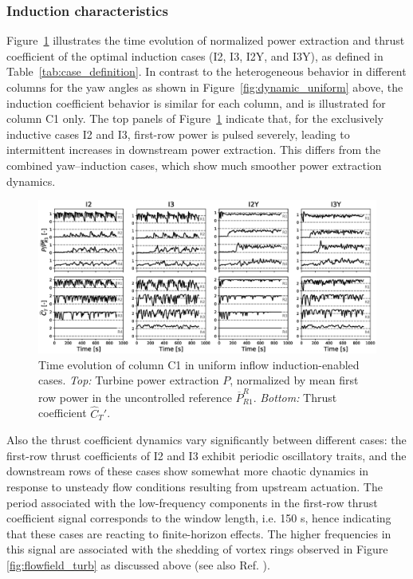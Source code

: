 \documentclass[energies,article,submit,moreauthors,latex,10pt,a4paper]{mdpi}
\begin{document}
\subsubsection{Induction characteristics}\label{subsec:uni_induction}
\noindent Figure~\ref{fig:dynamic_ctfilt} illustrates the time evolution of normalized power extraction and thrust coefficient of the optimal induction cases (I2, I3, I2Y, and I3Y), as defined in Table~\ref{tab:case_definition}. In contrast to the heterogeneous behavior in different columns for the yaw angles as shown in Figure~\ref{fig:dynamic_uniform} above, the induction coefficient behavior is similar for each column, and is illustrated for column C1 only. The top panels of Figure~\ref{fig:dynamic_ctfilt} indicate that, for the exclusively inductive cases I2 and I3, first-row power is pulsed severely, leading to intermittent increases in downstream power extraction. This differs from the combined yaw--induction cases, which show much smoother power extraction dynamics. 
\begin{figure}
	\includegraphics[width=\textwidth]{figure10}	
	\caption{Time evolution of column C1 in uniform inflow induction-enabled cases. \emph{Top: } Turbine power extraction $P$, normalized by mean first row power in the uncontrolled reference $\overline{P}_{R1}^R$. \emph{Bottom: } Thrust coefficient $\widehat{C}_T'$. \label{fig:dynamic_ctfilt}}
\end{figure}

Also the thrust coefficient dynamics vary significantly between different cases: the first-row thrust coefficients of I2 and I3 exhibit periodic oscillatory traits, and the downstream rows of these cases show somewhat more chaotic dynamics in response to unsteady flow conditions resulting from upstream actuation. The period associated with the low-frequency components in the first-row thrust coefficient signal corresponds to the window length, i.e. 150 s, hence indicating that these cases are reacting to finite-horizon effects.  The higher frequencies in this signal are associated with the shedding of vortex rings observed in Figure \ref{fig:flowfield_turb} as discussed above (see also Ref. \cite{muntersphd}).
\end{document}
